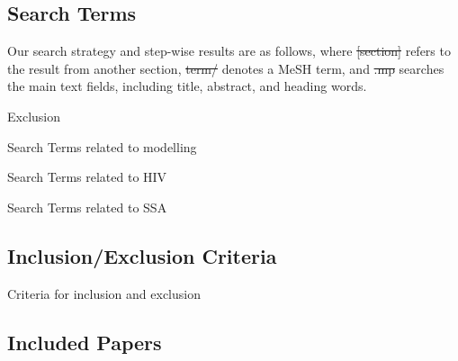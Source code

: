 \subsection{Search Terms}
\label{aa:search:terms}
Our search strategy and step-wise results are as follows, where
\st{[section]} refers to the result from another section,
\st{term/} denotes a MeSH term, and
\st{.mp} searches the main text fields, including
title, abstract, and heading words.
\def\searchsize{\scriptsize}
\begin{table}[H]
  \caption{Exclusion}
  \centering
  
  \label{tab:search-exclude}
\end{table}
\begin{table}[H]
  \caption{Search Terms related to modelling}
  \centering
  
  \label{tab:search-model}
\end{table}
\begin{table}[H]
  \caption{Search Terms related to HIV}
  \centering
  
  \label{tab:search-hiv}
\end{table}
\begin{table}[H]
  \caption{Search Terms related to SSA}
  \centering
  
  \label{tab:search-ssa}
\end{table}
\subsection{Inclusion/Exclusion Criteria}
\label{aa:search:criteria}
\begin{table}[H]
  \caption{Criteria for inclusion and exclusion}
  \centering
  
  \label{tab:search-criteria}
\end{table}
\clearpage
\subsection{Included Papers}
\label{aa:search:database}
\newcommand{\pseudocite}[1]{%
  \parbox{0.33\linewidth}{\scriptsize%
    \parbox{5ex}{\hfill\parencite{#1}}
    \parbox{5ex}{\citeyear{#1}}
    \citeauthor{#1}%
}}
\footnotesize
